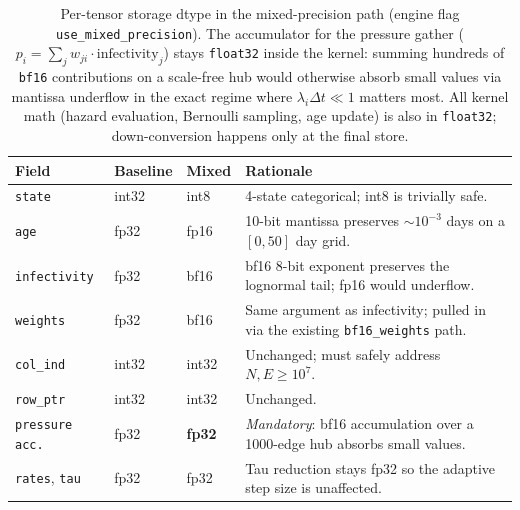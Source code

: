 \documentclass[a4paper,fleqn]{cas-sc}
\theoremstyle{definition}
\theoremstyle{remark}
\begin{document}
\begin{table}[!htbp]
\caption{Per-tensor storage dtype in the mixed-precision path (engine flag \texttt{use\_mixed\_precision}). The accumulator for the pressure gather ($p_i = \sum_j w_{ji} \cdot \mathrm{infectivity}_j$) stays \texttt{float32} inside the kernel: summing hundreds of \texttt{bf16} contributions on a scale-free hub would otherwise absorb small values via mantissa underflow in the exact regime where $\lambda_i \Delta t \ll 1$ matters most. All kernel math (hazard evaluation, Bernoulli sampling, age update) is also in \texttt{float32}; down-conversion happens only at the final store.}
\label{tab:mixed_precision_dtypes}
\centering
\begin{tabular*}{\tblwidth}{@{\extracolsep{\fill}}lllp{}@{}}
\toprule
\textbf{Field} & \textbf{Baseline} & \textbf{Mixed} & \textbf{Rationale} \\
\midrule
\texttt{state}        & int32    & int8     & 4-state categorical; int8 is trivially safe.                             \\
\texttt{age}          & fp32     & fp16     & 10-bit mantissa preserves $\sim\!10^{-3}$ days on a $[0, 50]$ day grid.  \\
\texttt{infectivity}  & fp32     & bf16     & bf16 8-bit exponent preserves the lognormal tail; fp16 would underflow. \\
\texttt{weights}      & fp32     & bf16     & Same argument as infectivity; pulled in via the existing \texttt{bf16\_weights} path. \\
\texttt{col\_ind}     & int32    & int32    & Unchanged; must safely address $N, E \geq 10^7$.                          \\
\texttt{row\_ptr}     & int32    & int32    & Unchanged.                                                                 \\
\texttt{pressure acc.}& fp32     & \textbf{fp32} & \emph{Mandatory}: bf16 accumulation over a 1000-edge hub absorbs small values. \\
\texttt{rates}, \texttt{tau}  & fp32     & fp32     & Tau reduction stays fp32 so the adaptive step size is unaffected.         \\
\bottomrule
\end{tabular*}
\end{table}
\end{document}
